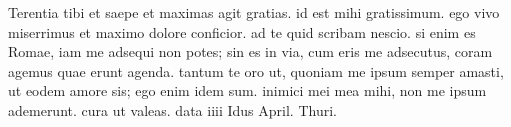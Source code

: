 


Terentia tibi et saepe et maximas agit gratias. id est mihi
            gratissimum. ego vivo miserrimus et maximo dolore conficior. ad te
            quid scribam nescio. si enim es Romae, iam me adsequi non potes;
            sin es in via, cum eris me adsecutus, coram agemus quae erunt agenda. tantum te oro ut, quoniam me ipsum semper amasti, ut eodem amore sis; ego enim idem sum. inimici mei mea mihi, non me ipsum ademerunt. cura ut valeas. data iiii Idus April. Thuri.
